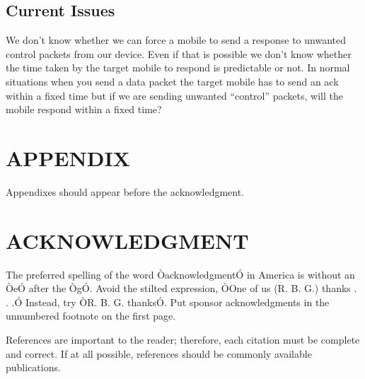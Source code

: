 \documentclass[letterpaper, 10 pt, conference]{ieeeconf}  %
\begin{document}
\subsection{Current Issues}

We don’t know whether we can force a mobile to send a response to unwanted control packets from our device. Even if that is possible we don’t know whether the time taken by the target mobile to respond is predictable or not. In normal situations when you send a data packet the target mobile has to send an ack within a fixed time but if we are sending unwanted “control” packets, will the mobile respond within a fixed time?

\section*{APPENDIX}

Appendixes should appear before the acknowledgment.

\section*{ACKNOWLEDGMENT}

The preferred spelling of the word ÒacknowledgmentÓ in America is without an ÒeÓ after the ÒgÓ. Avoid the stilted expression, ÒOne of us (R. B. G.) thanks . . .Ó  Instead, try ÒR. B. G. thanksÓ. Put sponsor acknowledgments in the unnumbered footnote on the first page.

References are important to the reader; therefore, each citation must be complete and correct. If at all possible, references should be commonly available publications.
\end{document}
